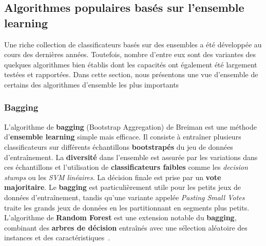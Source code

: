 \subsection{Algorithmes populaires basés sur l'ensemble learning}
Une riche collection de classificateurs basés sur des ensembles a été développée au cours des dernières années. Toutefois, nombre d'entre eux sont des variantes des quelques algorithmes bien établis dont les capacités ont également été largement testées et rapportées. Dans cette section, nous présentons une vue d'ensemble de certains des algorithmes d'ensemble les plus importants
\subsubsection{Bagging}
L'algorithme de \textbf{bagging} (Bootstrap Aggregation) de Breiman est une méthode d'\textbf{ensemble learning} simple mais efficace. Il consiste à entraîner plusieurs classificateurs sur différents échantillons \textbf{bootstrapés} du jeu de données d'entraînement. La \textbf{diversité} dans l'ensemble est assurée par les variations dans ces échantillons et l'utilisation de \textbf{classificateurs faibles} comme les \textit{decision stumps} ou les \textit{SVM linéaires}. La décision finale est prise par un \textbf{vote majoritaire}. Le \textbf{bagging} est particulièrement utile pour les petits jeux de données d'entraînement, tandis qu'une variante appelée \textit{Pasting Small Votes} traite les grands jeux de données en les partitionnant en segments plus petits. L'algorithme de \textbf{Random Forest} est une extension notable du \textbf{bagging}, combinant des \textbf{arbres de décision} entraînés avec une sélection aléatoire des instances et des caractéristiques~\cite{polikar2012ensemble}.


